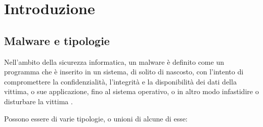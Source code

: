 \chapter{Introduzione}

\section{Malware e tipologie}
Nell'ambito della sicurezza informatica, un malware è definito come un programma che è inserito in un sistema, di solito di nascosto, con l'intento di compromettere la confidenzialità, l'integrità e la disponibilità dei dati della vittima, o sue applicazione, fino al sistema operativo, o in altro modo infastidire o disturbare la vittima \cite{Souppaya2013}.

Possono essere di varie tipologie, o unioni di alcune di esse: \cite{crowdstrike_malware_types}

